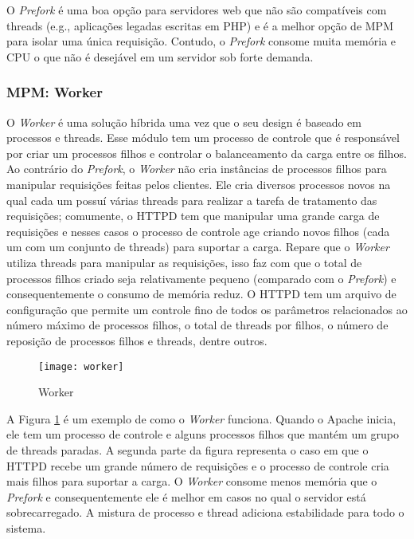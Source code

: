 O \textit{Prefork} é uma boa opção para servidores web que não são compatíveis
com threads (e.g., aplicações legadas escritas em PHP) e é a melhor opção de MPM
para isolar uma única requisição. Contudo, o \textit{Prefork} consome muita
memória e CPU o que não é desejável em um servidor sob forte demanda.

\subsubsection{MPM: Worker}

O \textit{Worker} é uma solução híbrida uma vez que o seu design é baseado em
processos e threads. Esse módulo tem um processo de controle que é responsável
por criar um processos filhos e controlar o balanceamento da carga entre os
filhos. Ao contrário do \textit{Prefork}, o \textit{Worker} não cria instâncias
de processos filhos para manipular requisições feitas pelos clientes. Ele cria
diversos processos novos na qual cada um possuí várias threads para realizar a
tarefa de tratamento das requisições; comumente, o HTTPD tem que manipular uma
grande carga de requisições e nesses casos o processo de controle age criando
novos filhos (cada um com um conjunto de threads) para suportar a carga.
Repare que o \textit{Worker} utiliza threads para manipular as requisições,
isso faz com que o total de processos filhos criado seja relativamente pequeno
(comparado com o \textit{Prefork}) e consequentemente o consumo de memória
reduz. O HTTPD tem um arquivo de configuração que permite um controle fino de
todos os parâmetros relacionados ao número máximo de processos filhos, o total
de threads por filhos, o número de reposição de processos filhos e threads,
dentre outros.

\begin{figure}[!h]
  \centering
  \texttt{[image: worker]} 
  \caption{Worker}
  \label{fig:worker} 
\end{figure}

A Figura \ref{fig:worker} é um exemplo de como o \textit{Worker} funciona.
Quando o Apache inicia, ele tem um processo de controle e alguns processos
filhos que mantém um grupo de threads paradas. A segunda parte da figura
representa o caso em que o HTTPD recebe um grande número de requisições e o
processo de controle cria mais filhos para suportar a carga. O \textit{Worker}
consome menos memória que o \textit{Prefork} e consequentemente ele é melhor em
casos no qual o servidor está sobrecarregado.  A mistura de processo e thread
adiciona estabilidade para todo o sistema.

